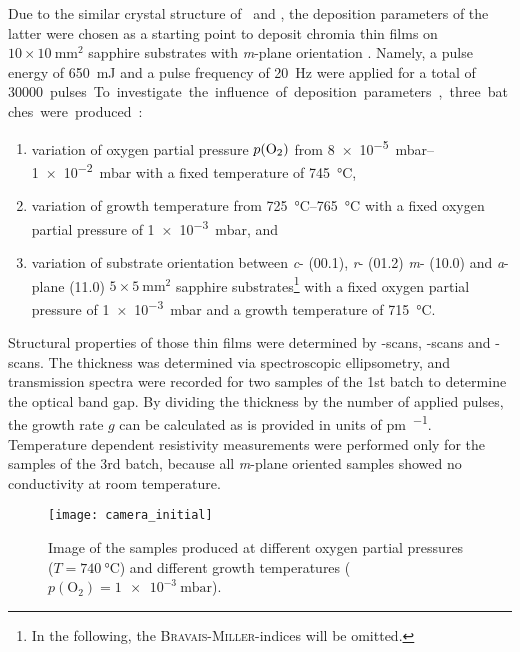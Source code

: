 Due to the similar crystal structure of \cro\ and \agao, the deposition parameters of the latter were chosen as a starting point to deposit chromia thin films on $10\times\qty{10}{\mm\squared}$ sapphire substrates with \textit{m}-plane orientation
    \cite{petersen2023}.
Namely, a pulse energy of \qty{650}{mJ} and a pulse frequency of \qty{20}{\Hz} were applied for a total of \qty{30000} pulses.
To investigate the influence of deposition parameters, three batches were produced:
\begin{enumerate}
    \item variation of oxygen partial pressure $p(\ce{O2})$ from \qtyrange{8e-5}{1e-2}{mbar} with a fixed temperature of \qty{745}{\degreeCelsius},
    \item variation of growth temperature from \qtyrange{725}{765}{\degreeCelsius} with a fixed oxygen partial pressure of \qty{1e-3}{mbar}, and
    \item variation of substrate orientation between \textit{c}- (00.1), \textit{r}- (01.2) \textit{m}- (10.0) and \textit{a}-plane (11.0) $5\times\qty{5}{\mm\squared}$ sapphire substrates\footnote{
        In the following, the \textsc{Bravais}-\textsc{Miller}-indices will be omitted.
        }
    with a fixed oxygen partial pressure of \qty{1e-3}{mbar} and a growth temperature of \qty{715}{\degreeCelsius}.
\end{enumerate}
Structural properties of those thin films were determined by \thetaomega-scans, \textomega-scans and \textphi-scans.
The thickness was determined via spectroscopic ellipsometry, and transmission spectra were recorded for two samples of the 1st batch to determine the optical band gap.
By dividing the thickness by the number of applied pulses, the growth rate $g$ can be calculated as is provided in units of \unit{\pm\per\pulse}.
Temperature dependent resistivity measurements were performed only for the samples of the 3rd batch, because all \textit{m}-plane oriented samples showed no conductivity at room temperature.

\begin{figure}
    \centering
    \texttt{[image: camera\_initial]}
    \caption{
        Image of the samples produced at different oxygen partial pressures ($T=\qty{740}{\degreeCelsius}$) and different growth temperatures ($p(\mathrm{O_2})=\qty{1e-3}{\milli\bar}$).
    }
    \label{Fig:Results_1_samplesPhoto}
\end{figure}
